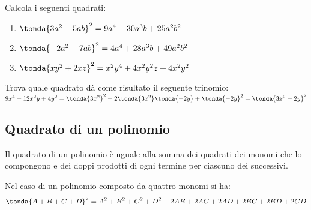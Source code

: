 \begin{esempio}{}{} Calcola i seguenti quadrati:
\begin{enumerate} [nosep]
\item \(\tonda{3a^2-5ab}^2 = 9a^4 - 30 a^3 b + 25a^2 b^2\)
\item \(\tonda{-2a^2-7ab}^2 = 4a^4 + 28 a^3 b + 49a^2 b^2\)
\item \(\tonda{xy^2+2xz}^2 = x^2 y^4 + 4 x^2 y^2 z + 4x^2 y^2\)
\end{enumerate}
\end{esempio}

\begin{esempio}{}{} Trova quale quadrato dà come risultato il seguente 
trinomio:\\
\(9x^4 - 12 x^2 y + 4y^2= 
\tonda{3x^2}^2 +2\tonda{3x^2}\tonda{-2y}+\tonda{-2y}^2=
\tonda{3x^2-2y}^2\)
\end{esempio}


\subsection{Quadrato di un polinomio}
\label{subsec:prodnot_quadratopolinomio}



\begin{teorema}{}{} 
Il quadrato di un polinomio è uguale alla somma
dei quadrati dei monomi che lo compongono e dei doppi prodotti di ogni
termine per ciascuno dei successivi.

Nel caso di un polinomio composto da quattro monomi si ha:
\[\tonda{A+B+C+D}^{2}=A^{2}+B^{2}+C^{2}+D^{2}+2{AB}+2{AC}+2{AD}+2{BC}+2
{BD}+2{CD}\]
\end{teorema}

